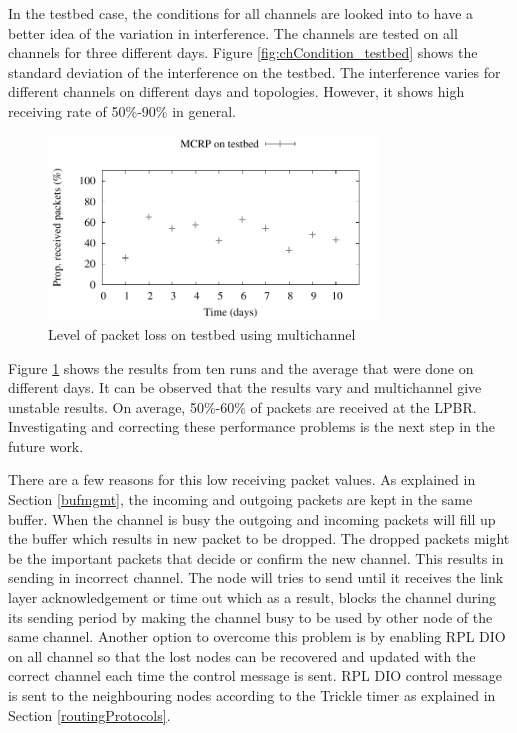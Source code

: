 In the testbed case, the conditions for all channels are looked into to have a better idea of the variation in interference. The channels are tested on all channels for three different days. Figure \ref{fig:chCondition_testbed} shows the standard deviation of the interference on the testbed. The interference varies for different channels on different days and topologies. However, it shows high receiving rate of 50\%-90\% in general.



\begin{figure}
\centering
\includegraphics[width=0.78\textwidth]{experiments/mct.pdf}
\caption{Level of packet loss on testbed using multichannel}
\label{fig:mcrp_testbed}
\end{figure}

Figure \ref{fig:mcrp_testbed} shows the results from ten runs and the average that were done on different days. It can be observed that the results vary and multichannel give unstable results. On average, 50\%-60\% of packets are received at the LPBR. 
Investigating and correcting these performance problems is the next step in the future work.

There are a few reasons for this low receiving packet values. As explained in Section \ref{bufmgmt}, the incoming and outgoing packets are kept in the same buffer. When the channel is busy the outgoing and incoming packets will fill up the buffer which results in new packet to be dropped. The dropped packets might be the important packets that decide or confirm the new channel. This results in sending in incorrect channel. The node will tries to send until it receives the link layer acknowledgement or time out which as a result, blocks the channel during its sending period by making the channel busy to be used by other node of the same channel. Another option to overcome this problem is by enabling RPL DIO on all channel so that the lost nodes can be recovered and updated with the correct channel each time the control message is sent. RPL DIO control message is sent to the neighbouring nodes according to the Trickle timer as explained in Section \ref{routingProtocols}.

